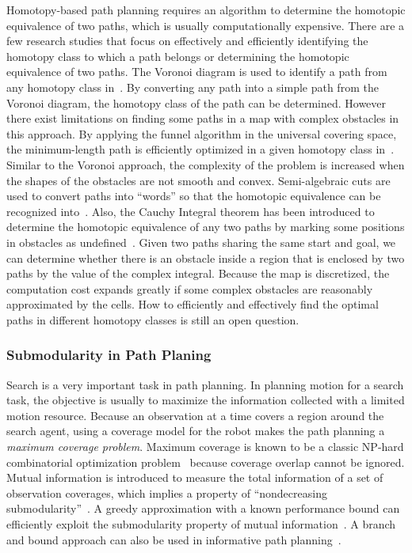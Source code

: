 \documentclass[phd]{byuprop}
\begin{document}
Homotopy-based path planning requires an algorithm to determine the homotopic equivalence of two paths, which is usually computationally expensive. 
There are a few research studies that focus on effectively and efficiently identifying the homotopy class to which a path belongs or determining the homotopic equivalence of two paths. 
The Voronoi diagram is used to identify a path from any homotopy class in~\cite{Banerjee2013}. 
By converting any path into a simple path from the Voronoi diagram, the homotopy class of the path can be determined. 
However there exist limitations on finding some paths in a map with complex obstacles in this approach.
By applying the funnel algorithm in the universal covering space, the minimum-length path is efficiently optimized in a given homotopy class in~\cite{Hershberger1994}. 
Similar to the Voronoi approach, the complexity of the problem is increased when the shapes of the obstacles are not smooth and convex. 
Semi-algebraic cuts are used to convert paths into “words” so that the homotopic equivalence can be recognized into~\cite{Grigoriev1998}. 
Also, the Cauchy Integral theorem has been introduced to determine the homotopic equivalence of any two paths by marking some positions in obstacles as undefined~\cite{Bhattachary2010}. 
Given two paths sharing the same start and goal, we can determine whether there is an obstacle inside a region that is enclosed by two paths by the value of the complex integral. 
Because the map is discretized, the computation cost expands greatly if some complex obstacles are reasonably approximated by the cells.
How to efficiently and effectively find the optimal paths in different homotopy classes is still an open question.

\subsubsection{Submodularity in Path Planing}
\label{sec:related_work:algorithm_specific_work:submodularity_in_path_planning}

Search is a very important task in path planning.
In planning motion for a search task, the objective is usually to maximize the information collected with a limited motion resource.
Because an observation at a time covers a region around the search agent, using a coverage model for the robot makes the path planning a {\em maximum coverage problem}.
Maximum coverage is known to be a classic NP-hard combinatorial optimization problem~\cite{Megiddo1983} because coverage overlap cannot be ignored. 
Mutual information is introduced to measure the total information
of a set of observation coverages, which implies a property of
“nondecreasing submodularity”~\cite{Singh2009}. 
A greedy approximation with a known performance bound can efficiently exploit the submodularity property of mutual information~\cite{Singh2009}. 
A branch and bound approach can also be used in informative path
planning~\cite{Binney2012}.
\end{document}
